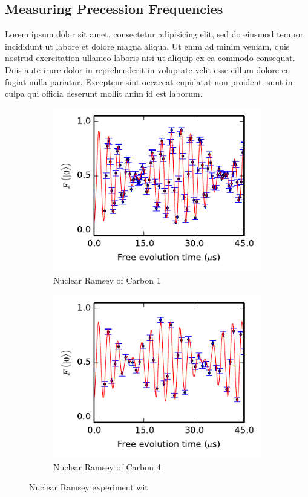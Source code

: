 \subsection*{Measuring Precession Frequencies}
Lorem ipsum dolor sit amet, consectetur adipisicing elit, sed do eiusmod
tempor incididunt ut labore et dolore magna aliqua. Ut enim ad minim veniam,
quis nostrud exercitation ullamco laboris nisi ut aliquip ex ea commodo
consequat. Duis aute irure dolor in reprehenderit in voluptate velit esse
cillum dolore eu fugiat nulla pariatur. Excepteur sint occaecat cupidatat non
proident, sunt in culpa qui officia deserunt mollit anim id est laborum.


\begin{figure}[htbp]
    \begin{subfigure}[t]{0.49\textwidth}\centering
    \includegraphics{Img/CarbonRamsey_C1.pdf}
    \caption{Nuclear Ramsey of Carbon 1} \label{fig:CR_C1}
    \end{subfigure}
    \begin{subfigure}[t]{0.49\textwidth}\centering
        \includegraphics{Img/CarbonRamsey_C4.pdf}
        \caption{Nuclear Ramsey of Carbon 4}
        \label{fig:CR_C4}
    \end{subfigure}
    \caption{Nuclear Ramsey experiment wit}
\end{figure}



